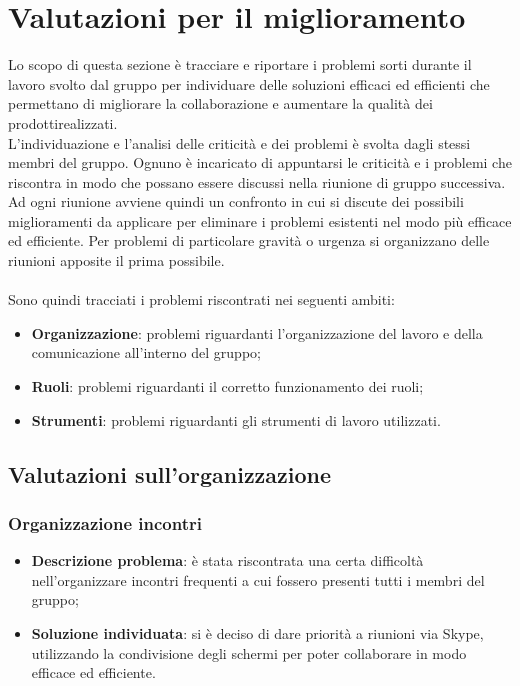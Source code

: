 \section{Valutazioni per il miglioramento} 
Lo scopo di questa sezione è tracciare e riportare i problemi sorti durante il lavoro svolto dal gruppo per individuare delle soluzioni efficaci ed efficienti che permettano di migliorare la collaborazione e aumentare la qualità dei prodotti\glosp realizzati.
\\L'individuazione e l'analisi delle criticità e dei problemi è svolta dagli stessi membri del gruppo. Ognuno è incaricato di appuntarsi le criticità e i problemi che riscontra in modo che possano essere discussi nella riunione di gruppo successiva. Ad ogni riunione avviene quindi un confronto in cui si discute dei possibili miglioramenti da applicare per eliminare i problemi esistenti nel modo più efficace ed efficiente. Per problemi di particolare gravità o urgenza si organizzano delle riunioni apposite il prima possibile.
\\ \\Sono quindi tracciati i problemi riscontrati nei seguenti ambiti:

\begin{itemize}
	\item \textbf{Organizzazione}: problemi riguardanti l'organizzazione del lavoro e della comunicazione all'interno del gruppo;
	\item \textbf{Ruoli}: problemi riguardanti il corretto funzionamento dei ruoli;
	\item \textbf{Strumenti}: problemi riguardanti gli strumenti di lavoro utilizzati.
\end{itemize}

\subsection{Valutazioni sull'organizzazione}
	\subsubsection{Organizzazione incontri}
		\begin{itemize}
			\item \textbf{Descrizione problema}: è stata riscontrata una certa difficoltà nell'organizzare incontri frequenti a cui fossero presenti tutti i membri del gruppo;
			\item \textbf{Soluzione individuata}: si è deciso di dare priorità a riunioni via Skype, utilizzando la condivisione degli schermi per poter collaborare in modo efficace ed efficiente.
		\end{itemize}
